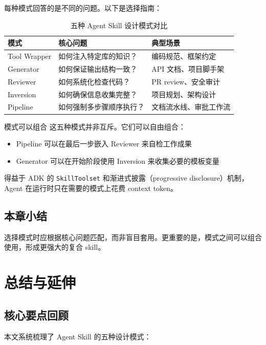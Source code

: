 \documentclass[a4paper]{article}
\begin{document}
每种模式回答的是不同的问题。以下是选择指南：

\begin{table}[H]
\centering
\begin{tabular}{@{}lll@{}}
\toprule
\textbf{模式} & \textbf{核心问题} & \textbf{典型场景} \\
\midrule
Tool Wrapper & 如何注入特定库的知识？ & 编码规范、框架约定 \\
Generator & 如何保证输出结构一致？ & API 文档、项目脚手架 \\
Reviewer & 如何系统化检查代码？ & PR review、安全审计 \\
Inversion & 如何确保信息收集完整？ & 项目规划、架构设计 \\
Pipeline & 如何强制多步骤顺序执行？ & 文档流水线、审批工作流 \\
\bottomrule
\end{tabular}
\caption{五种 Agent Skill 设计模式对比}
\end{table}

\begin{knowledgebox}{模式可以组合}
这五种模式并非互斥。它们可以自由组合：
\begin{itemize}
    \item Pipeline 可以在最后一步嵌入 Reviewer 来自检工作成果
    \item Generator 可以在开始阶段使用 Inversion 来收集必要的模板变量
\end{itemize}
得益于 ADK 的 \texttt{SkillToolset} 和渐进式披露（progressive disclosure）机制，Agent 在运行时只在需要的模式上花费 context token。
\end{knowledgebox}

\subsection{本章小结}

选择模式时应根据核心问题匹配，而非盲目套用。更重要的是，模式之间可以组合使用，形成更强大的复合 skill。

\section{总结与延伸}

\subsection{核心要点回顾}

本文系统梳理了 Agent Skill 的五种设计模式：
\end{document}

